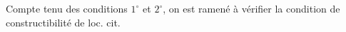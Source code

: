 Compte tenu des conditions $1^\circ$ et $2^\circ$, on est ramené à vérifier la condition de constructibilité de loc. cit.
